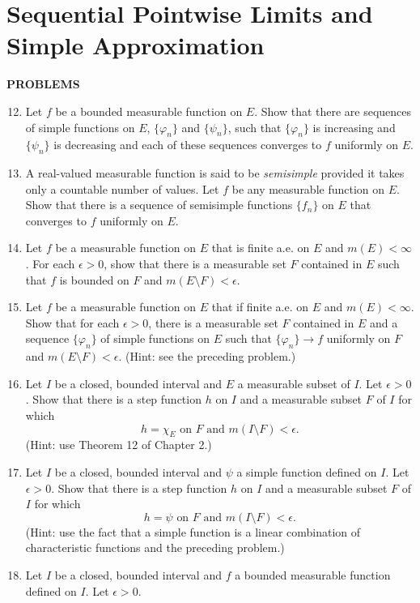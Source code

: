 \section{Sequential Pointwise Limits and Simple Approximation}
\begin{center}
	\textbf{PROBLEMS}
\end{center}
\begin{enumerate}
	\setcounter{enumi}{11}
    \item Let $f$ be a bounded measurable function on $E$. Show that there are sequences of simple functions on $E$, $\{\varphi_n\}$ and $\{\psi_n\}$, such that $\{\varphi_n\}$ is increasing and $\{\psi_n\}$ is decreasing and each of these sequences converges to $f$ uniformly on $E$.
    \item A real-valued measurable function is said to be \textit{semisimple} provided it takes only a countable number of values. Let $f$ be any measurable function on $E$.
    Show that there is a sequence of semisimple functions $\{f_n\}$ on $E$ that converges to $f$ uniformly on $E$.
    \item Let $f$ be a measurable function on $E$ that is finite a.e. on $E$ and $m(E)<\infty$.
    For each $\epsilon>0$, show that there is a measurable set $F$ contained in $E$ such that $f$ is bounded on $F$ and $m(E\setminus F)<\epsilon$.
    \item Let $f$ be a measurable function on $E$ that if finite a.e. on $E$ and $m(E)<\infty$. Show that for each $\epsilon>0$, there is a measurable set $F$ contained in $E$ and a sequence $\{\varphi_n\}$ of simple functions on $E$ such that $\{\varphi_n\}\to f$ uniformly on $F$ and $m(E\setminus F)<\epsilon$. (Hint: see the preceding problem.)
    \item Let $I$ be a closed, bounded interval and $E$ a measurable subset of $I$. Let $\epsilon>0$.
    Show that there is a step function $h$ on $I$ and a measurable subset $F$ of $I$ for which 
    \[
        h=\chi_E\text{ on }F\text{ and }m(I\setminus F)<\epsilon.    
    \]
    (Hint: use Theorem 12 of Chapter 2.)
    \item Let $I$ be a closed, bounded interval and $\psi$ a simple function defined on $I$. Let $\epsilon>0$.
    Show that there is a step function $h$ on $I$ and a measurable subset $F$ of $I$ for which 
    \[
        h=\psi\text{ on }F\text{ and }m(I\setminus F)<\epsilon.    
    \] 
    (Hint: use the fact that a simple function is a linear combination of characteristic functions and the preceding problem.)
    \item Let $I$ be a closed, bounded interval and $f$ a bounded measurable function defined on $I$. Let $\epsilon>0$.

\end{enumerate}
